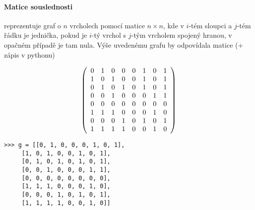 \paragraph{Matice souslednosti} reprezentuje graf o $n$ vrcholech pomocí matice $n\times n$, kde v $i$-tém sloupci a $j$-tém řádku je jednička, pokud
je $i$-tý vrchol s $j$-tým vrcholem spojený hranou, v opačném případě je tam nula. Výše uvedenému grafu by odpovídala matice (+ zápis v pythonu)
\begin{center}
\begin{minipage}{3.5cm}
$$
\left(
\begin{array}{cccccccc}
0 & 1 & 0 & 0 & 0 & 1 & 0 & 1\cr
1 & 0 & 1 & 0 & 0 & 1 & 0 & 1\cr
0 & 1 & 0 & 1 & 0 & 1 & 0 & 1\cr
0 & 0 & 1 & 0 & 0 & 0 & 1 & 1\cr
0 & 0 & 0 & 0 & 0 & 0 & 0 & 0\cr
1 & 1 & 1 & 0 & 0 & 0 & 1 & 0\cr
0 & 0 & 0 & 1 & 0 & 1 & 0 & 1\cr
1 & 1 & 1 & 1 & 0 & 0 & 1 & 0\cr
\end{array}
\right)
$$
\end{minipage}
\hskip2cm
\begin{minipage}{6cm}
\begin{verbatim}
>>> g = [[0, 1, 0, 0, 0, 1, 0, 1],
	 [1, 0, 1, 0, 0, 1, 0, 1],
	 [0, 1, 0, 1, 0, 1, 0, 1],
	 [0, 0, 1, 0, 0, 0, 1, 1],
	 [0, 0, 0, 0, 0, 0, 0, 0],
	 [1, 1, 1, 0, 0, 0, 1, 0],
	 [0, 0, 0, 1, 0, 1, 0, 1],
	 [1, 1, 1, 1, 0, 0, 1, 0]]
\end{verbatim}
\end{minipage}
\end{center}

